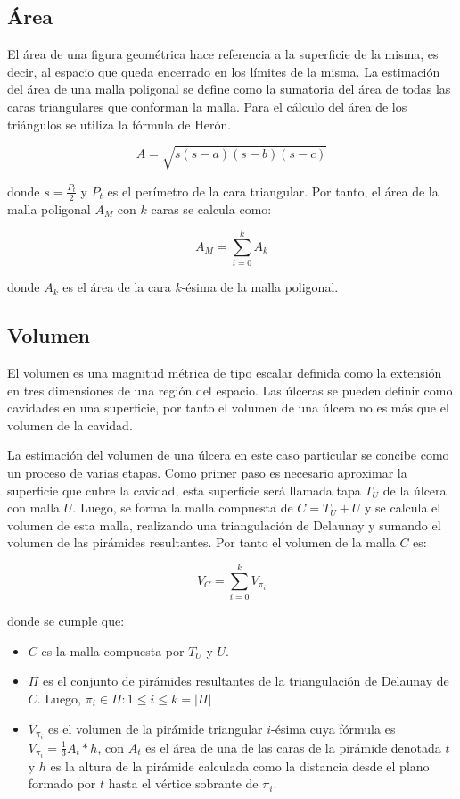 \subsection{Área}

El área de una figura geométrica hace referencia a la superficie de la misma, es decir, al espacio que queda encerrado en los límites de la misma. La estimación del área de una malla poligonal se define como la sumatoria del área de todas las caras triangulares que conforman la malla. Para el cálculo del área de los triángulos se utiliza la fórmula de Herón. 

$$A = \sqrt{s(s-a)(s-b)(s-c)}$$

donde $s = \frac{P_t}{2}$ y $P_t$ es el perímetro de la cara triangular. Por tanto, el área de la malla poligonal $A_M$ con $k$ caras se calcula como:

\begin{equation}
	A_M = \sum_{i = 0}^{k} A_k
\end{equation}

donde $A_k$ es el área de la cara $k$-ésima de la malla poligonal.

\subsection{Volumen}

El volumen es una magnitud métrica de tipo escalar definida como la extensión en tres dimensiones de una región del espacio. Las úlceras se pueden definir como cavidades en una superficie, por tanto el volumen de una úlcera no es más que el volumen de la cavidad.

La estimación del volumen de una úlcera en este caso particular se concibe como un proceso de varias etapas.  Como primer paso es necesario aproximar la superficie que cubre la cavidad, esta superficie será llamada tapa $T_U$ de la úlcera con malla $U$. Luego, se forma la malla compuesta de $C = T_U + U$ y se calcula el volumen de esta malla, realizando una triangulación de Delaunay y sumando el volumen de las pirámides resultantes. Por tanto el volumen de la malla $C$ es:

\begin{equation}
	V_C = \sum_{i = 0}^{k} V_{\pi_i}
\end{equation}

donde se cumple que: 

\begin{itemize}
	\item $C$ es la malla compuesta por $T_U$ y $U$.
	\item $\Pi$ es el conjunto de pirámides resultantes de la triangulación de Delaunay de $C$. Luego, $\pi_i \in \Pi: 1 \leq i \leq k = |\Pi|$
	\item $V_{\pi_i}$ es el volumen de la pirámide triangular $i$-ésima cuya fórmula es $V_{\pi_i} = \frac{1}{3}A_t * h$, con $A_t$ es el área de una de las caras de la pirámide denotada $t$ y $h$ es la altura de la pirámide calculada como la distancia desde el plano formado por $t$ hasta el vértice sobrante de $\pi_i$.
\end{itemize}


